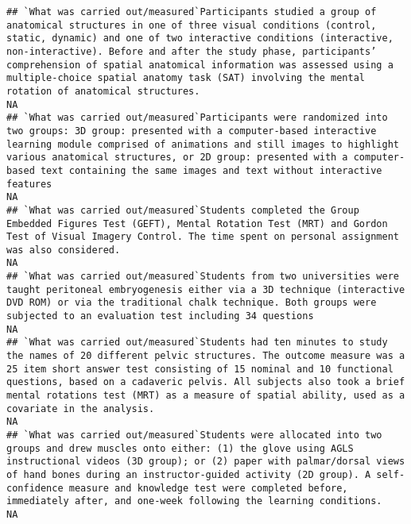 \documentclass[]{article}
\begin{document}
\begin{verbatim}
## `What was carried out/measured`Participants studied a group of anatomical structures in one of three visual conditions (control, static, dynamic) and one of two interactive conditions (interactive, non-interactive). Before and after the study phase, participants’ comprehension of spatial anatomical information was assessed using a multiple-choice spatial anatomy task (SAT) involving the mental rotation of anatomical structures.                                       NA
## `What was carried out/measured`Participants were randomized into two groups: 3D group: presented with a computer-based interactive learning module comprised of animations and still images to highlight various anatomical structures, or 2D group: presented with a computer-based text containing the same images and text without interactive features                                                                                                                            NA
## `What was carried out/measured`Students completed the Group Embedded Figures Test (GEFT), Mental Rotation Test (MRT) and Gordon Test of Visual Imagery Control. The time spent on personal assignment was also considered.                                                                                                                                                                                                                                                            NA
## `What was carried out/measured`Students from two universities were taught peritoneal embryogenesis either via a 3D technique (interactive DVD ROM) or via the traditional chalk technique. Both groups were subjected to an evaluation test including 34 questions                                                                                                                                                                                                                    NA
## `What was carried out/measured`Students had ten minutes to study the names of 20 different pelvic structures. The outcome measure was a 25 item short answer test consisting of 15 nominal and 10 functional questions, based on a cadaveric pelvis. All subjects also took a brief mental rotations test (MRT) as a measure of spatial ability, used as a covariate in the analysis.                                                                                                 NA
## `What was carried out/measured`Students were allocated into two groups and drew muscles onto either: (1) the glove using AGLS instructional videos (3D group); or (2) paper with palmar/dorsal views of hand bones during an instructor-guided activity (2D group). A self-confidence measure and knowledge test were completed before, immediately after, and one-week following the learning conditions.                                                                            NA

\end{verbatim}
\end{document}

